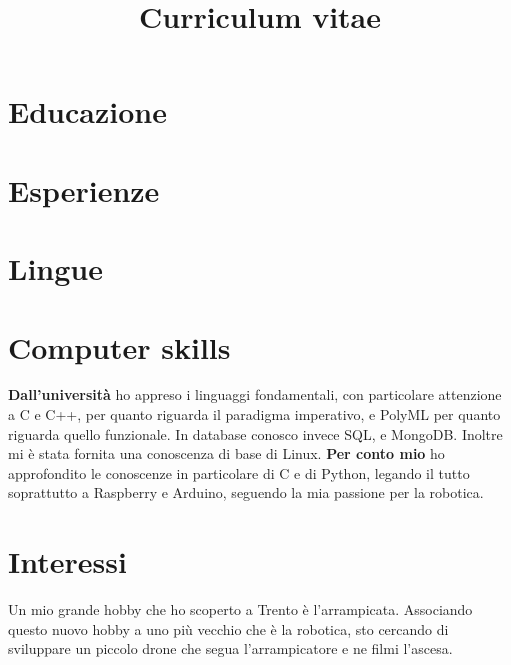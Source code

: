 \documentclass[10pt,a4paper,sans]{moderncv}        %
\title{Curriculum vitae}                               %
\begin{document}
\makecvtitle

\section{Educazione}

\section{Esperienze}

\section{Lingue}

\section{Computer skills}
\textbf{Dall'università} ho appreso i linguaggi fondamentali, con particolare attenzione a C e C++, per quanto riguarda il paradigma imperativo, e PolyML per quanto riguarda quello funzionale. In database conosco invece SQL, e MongoDB. Inoltre mi è stata fornita una conoscenza di base di Linux.\newline
\textbf{Per conto mio} ho approfondito le conoscenze in particolare di C e di Python, legando il tutto soprattutto a Raspberry e Arduino, seguendo la mia passione per la robotica. \newline

\section{Interessi}
Un mio grande hobby che ho scoperto a Trento è l'arrampicata. Associando questo nuovo hobby a uno più vecchio che è la robotica, sto cercando di sviluppare un piccolo drone che segua l'arrampicatore e ne filmi l'ascesa. 
\end{document}
